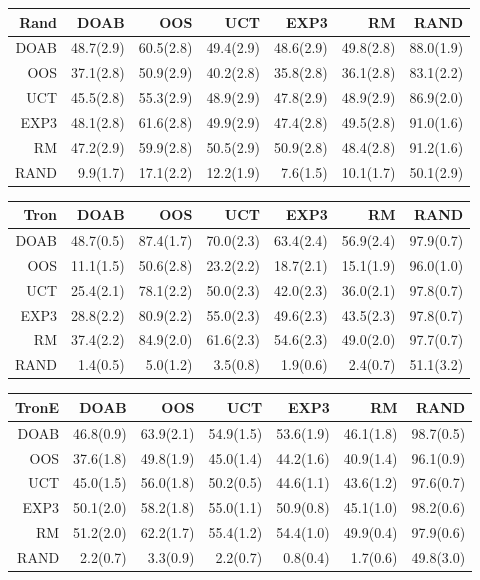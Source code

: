 \begin{figure}
\begin{footnotesize}
\begin{tabular}{|r|rrrrrr|}\hline
Rand&DOAB&OOS&UCT&EXP3&RM&RAND\\\hline
DOAB&48.7(2.9)&60.5(2.8)&49.4(2.9)&48.6(2.9)&49.8(2.8)&88.0(1.9)\\
OOS&37.1(2.8)&50.9(2.9)&40.2(2.8)&35.8(2.8)&36.1(2.8)&83.1(2.2)\\
UCT&45.5(2.8)&55.3(2.9)&48.9(2.9)&47.8(2.9)&48.9(2.9)&86.9(2.0)\\
EXP3&48.1(2.8)&61.6(2.8)&49.9(2.9)&47.4(2.8)&49.5(2.8)&91.0(1.6)\\
RM&47.2(2.9)&59.9(2.8)&50.5(2.9)&50.9(2.8)&48.4(2.8)&91.2(1.6)\\
RAND&9.9(1.7)&17.1(2.2)&12.2(1.9)&7.6(1.5)&10.1(1.7)&50.1(2.9)\\
\hline
\end{tabular}

\begin{tabular}{|r|rrrrrr|}\hline
Tron&DOAB&OOS&UCT&EXP3&RM&RAND\\\hline
DOAB&48.7(0.5)&87.4(1.7)&70.0(2.3)&63.4(2.4)&56.9(2.4)&97.9(0.7)\\
OOS&11.1(1.5)&50.6(2.8)&23.2(2.2)&18.7(2.1)&15.1(1.9)&96.0(1.0)\\
UCT&25.4(2.1)&78.1(2.2)&50.0(2.3)&42.0(2.3)&36.0(2.1)&97.8(0.7)\\
EXP3&28.8(2.2)&80.9(2.2)&55.0(2.3)&49.6(2.3)&43.5(2.3)&97.8(0.7)\\
RM&37.4(2.2)&84.9(2.0)&61.6(2.3)&54.6(2.3)&49.0(2.0)&97.7(0.7)\\
RAND&1.4(0.5)&5.0(1.2)&3.5(0.8)&1.9(0.6)&2.4(0.7)&51.1(3.2)\\
\hline
\end{tabular}

\begin{tabular}{|r|rrrrrr|}\hline
TronE&DOAB&OOS&UCT&EXP3&RM&RAND\\\hline
DOAB&46.8(0.9)&63.9(2.1)&54.9(1.5)&53.6(1.9)&46.1(1.8)&98.7(0.5)\\
OOS&37.6(1.8)&49.8(1.9)&45.0(1.4)&44.2(1.6)&40.9(1.4)&96.1(0.9)\\
UCT&45.0(1.5)&56.0(1.8)&50.2(0.5)&44.6(1.1)&43.6(1.2)&97.6(0.7)\\
EXP3&50.1(2.0)&58.2(1.8)&55.0(1.1)&50.9(0.8)&45.1(1.0)&98.2(0.6)\\
RM&51.2(2.0)&62.2(1.7)&55.4(1.2)&54.4(1.0)&49.9(0.4)&97.9(0.6)\\
RAND&2.2(0.7)&3.3(0.9)&2.2(0.7)&0.8(0.4)&1.7(0.6)&49.8(3.0)\\
\hline
\end{tabular}


\end{footnotesize}
\end{figure}
